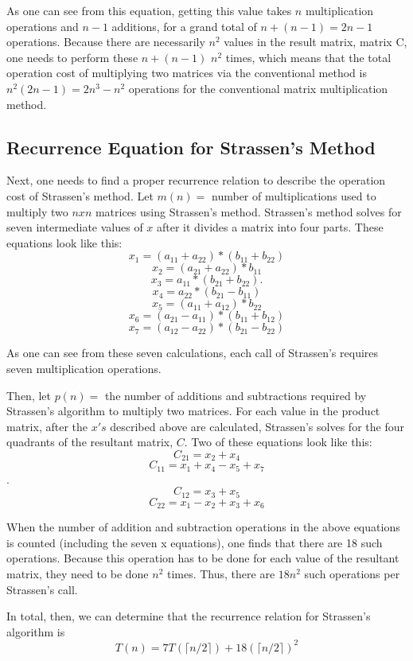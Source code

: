 \documentclass[]{article}
\begin{document}
As one can see from this equation, getting this value takes $n$ multiplication operations and $n-1$ additions, for a grand total of $n+(n-1) = 2n -1$ operations.   Because there are necessarily $n^2$ values in the result matrix, matrix C, one needs to perform these $n+(n-1)$ $n^2$ times, which means that the total operation cost of multiplying two matrices via the conventional method is $n^2(2n-1) = 2n^3 - n^2$ operations for the conventional matrix multiplication method.  

\subsection{Recurrence Equation for Strassen's Method}
Next, one needs to find a proper recurrence relation to describe the operation cost of Strassen's method. 
Let $m(n) =$ number of multiplications used to multiply two $nxn$ matrices using Strassen's method.  Strassen's method solves for seven intermediate values of $x$ after it divides a matrix into four parts.  These equations look like this: $$x_1 = (a_{11} +a_{22}) *(b_{11} + b_{22})$$ $$ x_2 = (a_{21} +a_{22}) * b_{11}$$ $$x_3 = a_{11}  * (b_{21} +b_{22}). $$ $$x_4 = a_{22} *(b_{21} - b_{11})$$ $$x_5 = (a_{11} +a_{12}) * b_{22}$$ $$x_6 = (a_{21} - a_{11}) * (b_{11} +b_{12}) $$ $$ x_7 = (a_{12} - a_{22}) * (b_{21} - b_{22})$$   

As one can see from these seven calculations, each call of Strassen's requires seven multiplication operations.  

Then, let $p(n) = $ the number of additions and subtractions required by Strassen's algorithm to multiply two matrices.  For each value in the product matrix, after the $x's$ described above are calculated, Strassen's solves for the four quadrants of the resultant matrix, $C$.  Two of these equations look like this: $$C_{21} = x_2 + x_4$$ $$C_{11} = x_1 + x_4 - x_5 + x_7$$.  $$C_{12} = x_3 + x_5$$ $$C_{22} = x_1 - x_2 + x_3 + x_6 $$

When the number of addition and subtraction operations in the above equations is counted (including the seven x equations), one finds that there are 18 such operations.  Because this operation has to be done for each value of the resultant matrix, they need to be done $n^2$ times.  Thus, there are $18n^2$ such operations per Strassen's call.  

In total, then, we can determine that the recurrence relation for Strassen's algorithm is $$T(n) = 7T(\lceil n/2 \rceil) + 18(\lceil n/2 \rceil )^2$$
\end{document}
